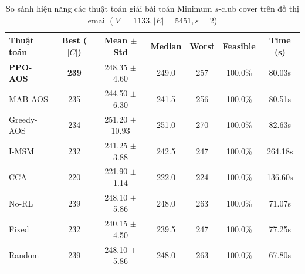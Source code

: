 \begin{table}[htbp]
\centering
\caption{So sánh hiệu năng các thuật toán giải bài toán Minimum $s$-club cover trên đồ thị email ($|V|=1133, |E|=5451, s=2$)}
\label{tab:results_email}
\begin{tabular}{lcccccc}
\hline
\textbf{Thuật toán} & \textbf{Best ($|C|$)} & \textbf{Mean $\pm$ Std} & \textbf{Median} & \textbf{Worst} & \textbf{Feasible} & \textbf{Time (s)} \\
\hline
\textbf{PPO-AOS} & \textbf{239} & 248.35 $\pm$ 4.60 & 249.0 & 257 & 100.0\% & 80.03s \\
MAB-AOS & 235 & 244.50 $\pm$ 6.30 & 241.5 & 256 & 100.0\% & 80.51s \\
Greedy-AOS & 234 & 251.20 $\pm$ 10.93 & 251.0 & 270 & 100.0\% & 82.63s \\
I-MSM & 232 & 241.25 $\pm$ 3.88 & 242.5 & 247 & 100.0\% & 264.18s \\
CCA & 220 & 221.90 $\pm$ 1.14 & 222.0 & 224 & 100.0\% & 136.60s \\
No-RL & 239 & 248.10 $\pm$ 5.86 & 248.0 & 263 & 100.0\% & 71.07s \\
Fixed & 232 & 240.15 $\pm$ 4.50 & 239.5 & 247 & 100.0\% & 77.25s \\
Random & 239 & 248.10 $\pm$ 5.86 & 248.0 & 263 & 100.0\% & 67.80s \\
\hline
\end{tabular}
\end{table}
